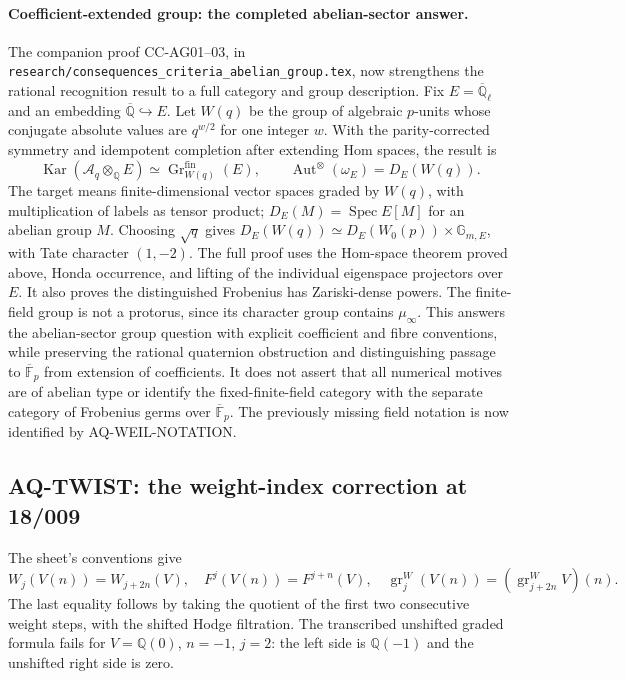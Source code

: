 \paragraph{Coefficient-extended group: the completed abelian-sector answer.}
The companion proof CC-AG01--03, in
\texttt{research/consequences\_criteria\_abelian\_group.tex},
now strengthens the rational recognition result to a full
category and group description. Fix
$E=\overline{\mathbb Q}_\ell$ and an embedding
$\overline{\mathbb Q}\hookrightarrow E$. Let $W(q)$ be the
group of algebraic $p$-units whose conjugate absolute values
are $q^{w/2}$ for one integer $w$. With the parity-corrected
symmetry and idempotent completion after extending Hom spaces,
the result is
\[
 \operatorname{Kar}(\mathcal A_q\otimes_{\mathbb Q}E)
  \simeq \operatorname{Gr}^{\mathrm{fin}}_{W(q)}(E),\qquad
 \operatorname{Aut}^{\otimes}(\omega_E)=D_E(W(q)).
\]
The target means finite-dimensional vector spaces graded by
$W(q)$, with multiplication of labels as tensor product;
$D_E(M)=\operatorname{Spec}E[M]$ for an abelian group $M$.
Choosing $\sqrt q$ gives
$D_E(W(q))\simeq D_E(W_0(p))\times\mathbb G_{m,E}$,
with Tate character $(1,-2)$. The full proof uses the
Hom-space theorem proved above, Honda occurrence, and
lifting of the individual eigenspace projectors over $E$.
It also proves the distinguished Frobenius has Zariski-dense
powers. The finite-field group is not a protorus, since its
character group contains $\mu_\infty$. This answers the
abelian-sector group question with explicit coefficient and
fibre conventions, while preserving the rational quaternion
obstruction and distinguishing passage to
$\overline{\mathbb F}_p$ from extension of coefficients.
It does not assert that all numerical motives are of
abelian type or identify the fixed-finite-field category
with the separate category of Frobenius germs over
$\overline{\mathbb F}_p$.  The previously missing field
notation is now identified by AQ-WEIL-NOTATION.

\subsection{AQ-TWIST: the weight-index correction at 18/009}
The sheet's conventions give
\[
 W_j(V(n))=W_{j+2n}(V),\quad F^j(V(n))=F^{j+n}(V),\quad
 \operatorname{gr}^W_j(V(n))
 =(\operatorname{gr}^W_{j+2n}V)(n).                             \tag{AQ.6}
\]
The last equality follows by taking the quotient of the
first two consecutive weight steps, with the shifted Hodge
filtration. The transcribed unshifted graded formula fails
for $V=\mathbb Q(0)$, $n=-1$, $j=2$: the left side is
$\mathbb Q(-1)$ and the unshifted right side is zero.

